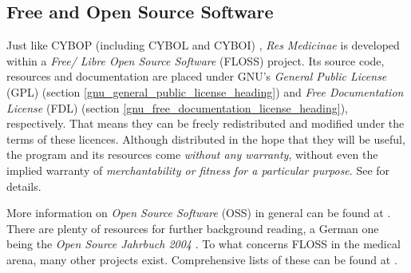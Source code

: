 %
%
%
%
%
%
%

\subsection{Free and Open Source Software}
\label{free_and_open_source_software_heading}

Just like CYBOP (including CYBOL and CYBOI) \cite{cybop}, \emph{Res Medicinae}
\cite{resmedicinae} is developed within a \emph{Free/ Libre Open Source Software}
(FLOSS) project. Its source code, resources and documentation are placed under
GNU's \emph{General Public License} (GPL) (section
\ref{gnu_general_public_license_heading}) and \emph{Free Documentation License}
(FDL) (section \ref{gnu_free_documentation_license_heading}), respectively.
That means they can be freely redistributed and modified under the terms of
these licences. Although distributed in the hope that they will be useful, the
program and its resources come \emph{without any warranty}, without even the
implied warranty of \emph{merchantability or fitness for a particular purpose}.
See \cite{gnulicences} for details.

More information on \emph{Open Source Software} (OSS) in general can be found
at \cite{opensource}. There are plenty of resources for further background
reading, a German one being the \emph{Open Source Jahrbuch 2004}
\cite{opensourcejahrbuch2004}. To what concerns FLOSS in the medical arena,
many other projects exist. Comprehensive lists of these can be found at
\cite{euspirit, linuxmednews, medhowto}.
